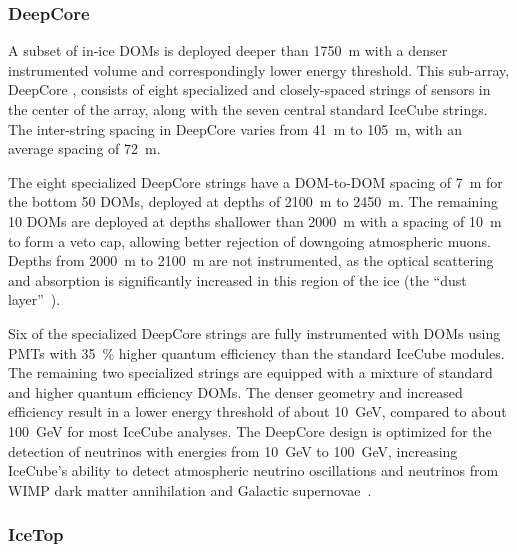 \subsubsection{DeepCore}

A subset of in-ice DOMs is deployed deeper than \SI{1750}{\meter} with a denser instrumented volume and
correspondingly lower energy threshold. This
sub-array, DeepCore \cite{ICECUBE:DC}, consists of eight specialized and
closely-spaced strings of sensors in the center of the array, along with
the seven central standard IceCube strings. The inter-string spacing
in DeepCore varies from \SI{41}{\meter} to \SI{105}{\meter}, with an
average spacing of \SI{72}{\meter}.

The eight specialized DeepCore strings have a DOM-to-DOM spacing of
\SI{7}{\meter} for the bottom 50 DOMs, deployed at depths of
\SI{2100}{\meter} to \SI{2450}{\meter}.  The remaining 10 DOMs are
deployed at depths shallower than \SI{2000}{\meter} with a spacing of
\SI{10}{\meter} to form a veto cap, allowing better rejection of downgoing
atmospheric muons.  Depths from \SI{2000}{\meter} to \SI{2100}{\meter}
are not instrumented, as the optical scattering and absorption is
significantly increased in this region of the ice (the ``dust layer''~\cite{Aartsen:2013rt}).

Six of the specialized DeepCore strings are fully instrumented with
DOMs using PMTs with \SI{35}{\%} higher quantum efficiency than the
standard IceCube modules. The remaining two specialized strings are
equipped with a mixture of standard and higher quantum efficiency DOMs. The denser geometry and increased efficiency
result in a lower energy threshold of about
\SI{10}{\giga\electronvolt}, compared to about
\SI{100}{\giga\electronvolt} for most IceCube analyses. The DeepCore design
is optimized for the detection of neutrinos with energies
from \SI{10}{\giga\electronvolt} to \SI{100}{\giga\electronvolt},
increasing IceCube's ability to detect atmospheric neutrino
oscillations and neutrinos from WIMP dark matter annihilation and Galactic
supernovae~\cite{ICECUBE:DC}. 

\subsubsection{IceTop}


